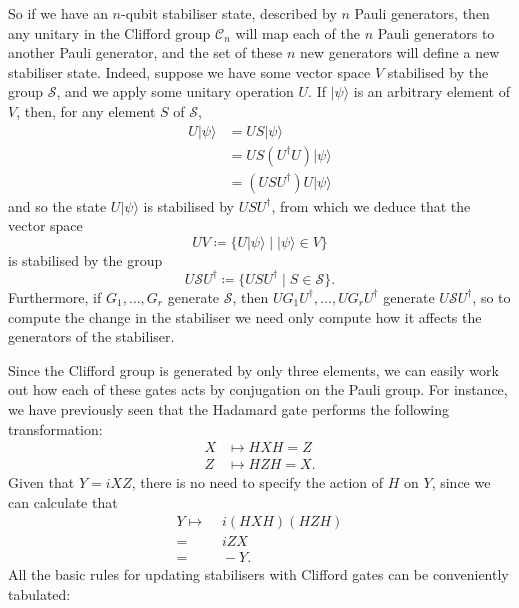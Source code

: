 \documentclass[fleqn]{article}
\begin{document}
So if we have an \(n\)-qubit stabiliser state, described by \(n\) Pauli generators, then any unitary in the Clifford group \(\mathcal{C}_n\) will map each of the \(n\) Pauli generators to another Pauli generator, and the set of these \(n\) new generators will define a new stabiliser state.
Indeed, suppose we have some vector space \(V\) stabilised by the group \(\mathcal{S}\), and we apply some unitary operation \(U\).
If \(|\psi\rangle\) is an arbitrary element of \(V\), then, for any element \(S\) of \(\mathcal{S}\),
\[
  \begin{aligned}
    U|\psi\rangle
    &= US|\psi\rangle
    \\&= US(U^\dagger U)|\psi\rangle
    \\&= (USU^\dagger)U|\psi\rangle
  \end{aligned}
\]
and so the state \(U|\psi\rangle\) is stabilised by \(USU^\dagger\), from which we deduce that the vector space
\[
  UV \coloneqq \{U|\psi\rangle \mid |\psi\rangle\in V\}
\]
is stabilised by the group
\[
  U\mathcal{S}U^\dagger \coloneqq \{USU^\dagger \mid S\in\mathcal{S}\}.
\]
Furthermore, if \(G_1,\ldots,G_r\) generate \(\mathcal{S}\), then \(UG_1U^\dagger,\ldots,UG_rU^\dagger\) generate \(U\mathcal{S}U^\dagger\), so to compute the change in the stabiliser we need only compute how it affects the generators of the stabiliser.

Since the Clifford group is generated by only three elements, we can easily work out how each of these gates acts by conjugation on the Pauli group.
For instance, we have previously seen that the Hadamard gate performs the following transformation:
\[
  \begin{aligned}
    X
    &\longmapsto HXH = Z
  \\Z
    &\longmapsto HZH = X.
  \end{aligned}
\]
Given that \(Y=iXZ\), there is no need to specify the action of \(H\) on \(Y\), since we can calculate that
\[
  \begin{aligned}
    Y\longmapsto
    &\,\,i(HXH)(HZH)
  \\=&\,\,iZX
  \\=&\,\,-Y.
  \end{aligned}
\]
All the basic rules for updating stabilisers with Clifford gates can be conveniently tabulated:

\[
\]
\end{document}
